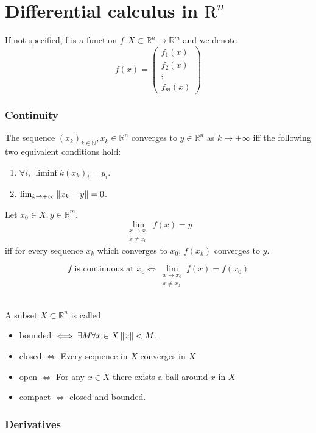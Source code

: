 \part{Differential calculus in $\text{R}^n$}
\setcounter{section}{0}
If not specified, f is a function $f\colon X\subset \mathbb{R}^n\to\mathbb{R}^m$ and we denote
$$f(x) = \begin{pmatrix}f_1(x)\\f_2(x)\\\vdots\\f_m(x)\end{pmatrix}$$
\section{Continuity}

\Prop[Sequences] The sequence $(x_k)_{k\in\mathbb{N}}, x_k \in \mathbb{R}^n$ converges to $y\in \mathbb{R}^n$ as $k\rightarrow +\infty$ iff the following two equivalent conditions hold:
\begin{enumerate}
    \item $\forall i$, $\liminf{k}(x_{k})_i= y_i $.
    \item $\lim_{k\rightarrow +\infty}\left\lVert x_k-y \right\rVert=0$.
\end{enumerate}

\Prop[Limit] Let $x_0 \in X, y\in\mathbb{R}^m$.
$$ \lim_{\substack{x\rightarrow x_0 \\x \neq x_0}} f(x) = y $$
iff for every sequence $x_k$ which converges to $x_0$, $f(x_k)$ converges to $y$.

\Def[Continuity]
$$ f \text{ is continuous at } x_0 \iff \lim_{\substack{x\rightarrow x_0 \\x \neq x_0}} f(x) = f(x_0)$$

 \\
A subset $X\subset\mathbb{R}^n$ is called
\begin{itemize}
    \item bounded $\iff \exists M \forall x \in X \left\lVert x \right\rVert<M$.
    \item closed $\iff $ Every sequence in $X$ converges in $X$
   	\item open $\iff$ For any $x \in X$ there exists a ball around $x$ in $X$
   	\item compact $\iff$ closed and bounded.
\end{itemize}

\section{Derivatives}

